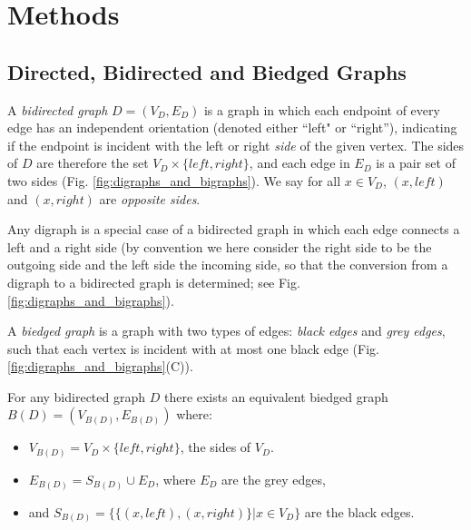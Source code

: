 \documentclass[11pt]{ucthesis}
\begin{document}

\section{Methods}

\subsection{Directed, Bidirected and Biedged Graphs}

A \emph{bidirected graph} $D = (V_D, E_D)$ is a graph in which each endpoint of every edge has an independent orientation (denoted either “left" or “right”),  indicating if the endpoint is incident with the left or right \emph{side} of the given vertex. The sides of $D$ are therefore the set $V_D \times \{ left, right \}$, and each edge in $E_D$ is  a pair set of two sides (Fig. \ref{fig:digraphs_and_bigraphs}). We say for all $x \in V_D$, $(x, left)$ and $(x, right)$ are \emph{opposite sides}.

Any digraph is a special case of a bidirected graph in which each edge connects a left and a right side (by convention we here consider the right side to be the outgoing side and the left side the incoming side, so that the conversion from a digraph to a bidirected graph is determined; see Fig. \ref{fig:digraphs_and_bigraphs}). 

A \emph{biedged graph} is a graph with two types of edges: \emph{black edges} and \emph{grey edges}, such that each vertex is incident with at most one black edge (Fig. \ref{fig:digraphs_and_bigraphs}(C)).  

For any bidirected graph $D$ there exists an equivalent biedged graph $B(D) = (V_{B(D)}, E_{B(D)})$ where:
\begin{itemize}
\item $V_{B(D)} = V_D \times \{ left, right \}$, the sides of $V_D$. 
\item $E_{B(D)} = S_{B(D)} \cup E_{D}$, where $E_{D}$ are the grey edges,
\item and $S_{B(D)} = \{ \{ (x, left), (x, right) \} | x \in V_{D} \}$ are the black edges. 
\end{itemize}
\end{document}
